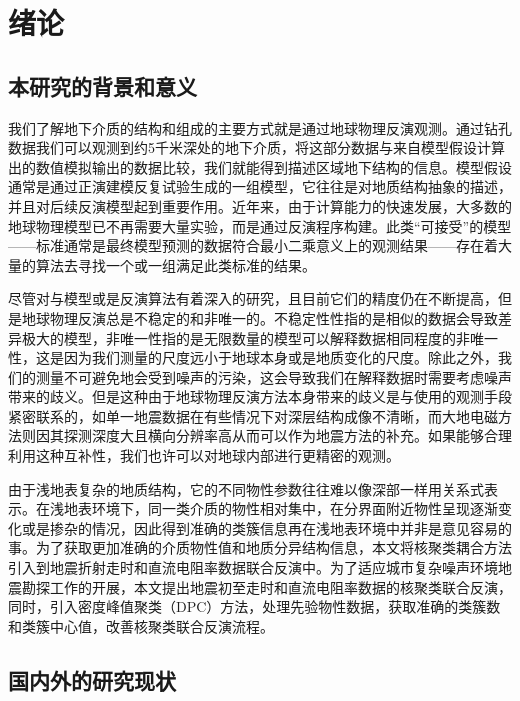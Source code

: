 \cleardoublepage

\section{绪论}

\subsection{本研究的背景和意义}

我们了解地下介质的结构和组成的主要方式就是通过地球物理反演观测。通过钻孔数据我们可以观测到约5千米深处的地下介质，将这部分数据与来自模型假设计算出的数值模拟输出的数据比较，我们就能得到描述区域地下结构的信息。模型假设通常是通过正演建模反复试验生成的一组模型，它往往是对地质结构抽象的描述，并且对后续反演模型起到重要作用。近年来，由于计算能力的快速发展，大多数的地球物理模型已不再需要大量实验，而是通过反演程序构建。此类“可接受”的模型——标准通常是最终模型预测的数据符合最小二乘意义上的观测结果——存在着大量的算法去寻找一个或一组满足此类标准的结果\cite{nocedal2006conjugate}。

尽管对与模型或是反演算法有着深入的研究，且目前它们的精度仍在不断提高，但是地球物理反演总是不稳定的和非唯一的。不稳定性性指的是相似的数据会导致差异极大的模型\cite{backus1967numerical}，非唯一性指的是无限数量的模型可以解释数据相同程度的非唯一性\cite{munoz2006beyond}，这是因为我们测量的尺度远小于地球本身或是地质变化的尺度。除此之外，我们的测量不可避免地会受到噪声的污染，这会导致我们在解释数据时需要考虑噪声带来的歧义。但是这种由于地球物理反演方法本身带来的歧义是与使用的观测手段紧密联系的，如单一地震数据在有些情况下对深层结构成像不清晰，而大地电磁方法则因其探测深度大且横向分辨率高从而可以作为地震方法的补充。如果能够合理利用这种互补性，我们也许可以对地球内部进行更精密的观测。\cite{杨博2021基于聚类和多元地质统计学的电}

由于浅地表复杂的地质结构，它的不同物性参数往往难以像深部一样用关系式表示。在浅地表环境下，同一类介质的物性相对集中，在分界面附近物性呈现逐渐变化或是掺杂的情况，因此得到准确的类簇信息再在浅地表环境中并非是意见容易的事。为了获取更加准确的介质物性值和地质分异结构信息，本文将核聚类耦合方法引入到地震折射走时和直流电阻率数据联合反演中。为了适应城市复杂噪声环境地震勘探工作的开展，本文提出地震初至走时和直流电阻率数据的核聚类联合反演，同时，引入密度峰值聚类（DPC）方法，处理先验物性数据，获取准确的类簇数和类簇中心值，改善核聚类联合反演流程。

\subsection{国内外的研究现状}


